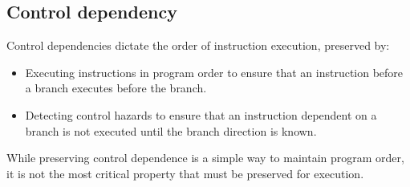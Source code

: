 \subsection{Control dependency}
Control dependencies dictate the order of instruction execution, preserved by:
\begin{itemize}
    \item Executing instructions in program order to ensure that an instruction before a branch executes before the branch.
    \item Detecting control hazards to ensure that an instruction dependent on a branch is not executed until the branch direction is known.
\end{itemize}
While preserving control dependence is a simple way to maintain program order, it is not the most critical property that must be preserved for execution.